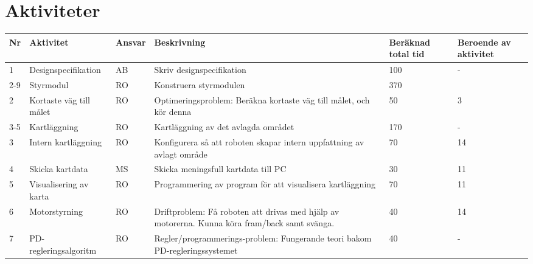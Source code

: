 \documentclass[11pt]{article}
\begin{document}
\begin{flushleft}
\begin{table}[h]
\begin{tabular}{|l|p{.75\linewidth}|l|}
\end{tabular}
\end{table}

\pagebreak

\section{Aktiviteter}
\begin{longtable}{|l|p{.20\linewidth}|l|p{.30\linewidth}|p{.10\linewidth}|p{.10\linewidth}|} \hline

Nr & 
Aktivitet & 
Ansvar & 
Beskrivning & 
Beräknad total tid &
Beroende av aktivitet \\[0.1in] \hline


%
% 
 
1 &
Designspecifikation &
AB &
Skriv designspecifikation &
100 &
- \\ \hline
 
2-9 &
Styrmodul &
RO &
Konstruera styrmodulen &
370 &
 \\ \hline

2 &
Kortaste väg till målet &
RO &
Optimeringsproblem: Beräkna kortaste väg till målet, och kör denna &
50 &
3 \\ \hline
 
3-5 &
Kartläggning &
RO &
Kartläggning av det avlagda området &
170 &
-\\ \hline

3 &
Intern kartläggning &
RO &
Konfigurera så att roboten skapar intern uppfattning av avlagt område &
70 &
14 \\ \hline

4 &
Skicka kartdata &
MS &
Skicka meningsfull kartdata till PC&
30 &
11 \\ \hline

5 &
Visualisering av karta &
RO &
Programmering av program för att visualisera kartläggning &
70 &
11 \\ \hline
 
6 &
Motorstyrning &
RO &
Driftproblem: Få roboten att drivas med hjälp av motorerna. Kunna köra fram/back samt svänga. &
40 &
14 \\ \hline
 
 
7 &
PD-regleringsalgoritm &
RO &
Regler/programmerings-problem: Fungerande teori bakom PD-regleringssystemet &
40 &
- \\ \hline


\end{longtable}
\end{flushleft}
\end{document}
